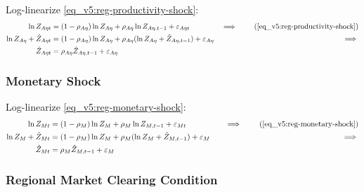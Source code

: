 \documentclass[../thesis.tex]{subfiles}
\begin{document}
Log-linearize \ref{eq_v5:reg-productivity-shock}:
\begin{alignat}{2}
	\ln{Z_{A\eta t}} &= (1-\rho_{A\eta})\ln{Z_{A\eta}} + \rho_{A\eta}\ln{Z_{A\eta,t-1}} + \varepsilon_{A\eta t} &\implies \tag{\ref{eq_v5:reg-productivity-shock}} \\
	\ln{Z_{A\eta}} + \hat{Z}_{A\eta t} &= (1-\rho_{A\eta}) \ln{Z_{A\eta}} + \rho_{A\eta} (\ln{Z_{A\eta}} + \hat{Z}_{A\eta, t-1}) + \varepsilon_{A\eta} &\implies \nonumber \\
	\hat{Z}_{A\eta t} &= \rho_{A\eta} \hat{Z}_{A\eta, t-1} + \varepsilon_{A\eta} \label{eq_v5:reg-ll-productivity-shock}
\end{alignat}


\subsubsection*{Monetary Shock}

Log-linearize \ref{eq_v5:reg-monetary-shock}:
\begin{alignat}{2}
	\ln{Z_{Mt}} &= (1-\rho_M)\ln{Z_M} + \rho_M\ln{Z_{M,t-1}} + \varepsilon_{Mt} &\implies \tag{\ref{eq_v5:reg-monetary-shock}} \\
	\ln{Z_{M}} + \hat{Z}_{Mt} &= (1-\rho_M) \ln{Z_M} + \rho_M (\ln{Z_{M}} + \hat{Z}_{M,t-1}) + \varepsilon_{M} \quad &\implies \nonumber \\
	\hat{Z}_{Mt} &= \rho_M \hat{Z}_{M,t-1} + \varepsilon_{M} \label{eq_v5:reg-ll-monetary-shock}
\end{alignat}


\subsubsection*{Regional Market Clearing Condition}
\end{document}
